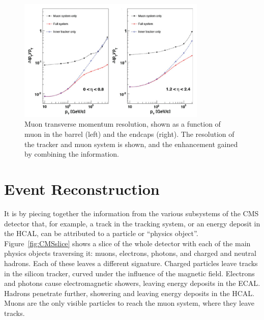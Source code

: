 \begin{figure}[htbp]
  \begin{center}
  \includegraphics[width=0.8\textwidth]{Figures/detector/CMSmuonRes}
  \caption{Muon transverse momentum resolution, shown as a function of muon \pt in the barrel (left) and the endcaps (right). The resolution of the tracker and muon system is shown, and the enhancement gained by combining the information.
}
  \label{fig:CMSmuonRes}
  \end{center}
\end{figure}

%                                                                  

\newpage
\section{Event Reconstruction} \label{sec:CMSreco}

It is by piecing together the information from the various subsystems of the \ac{CMS} detector that, for example, a track in the tracking system, or an energy deposit in the \ac{HCAL}, can be attributed to a particle or ``physics object''. 
Figure~\ref{fig:CMSslice} shows a slice of the whole detector with each of the main physics objects traversing it: muons, electrons, photons, and charged and neutral hadrons.
Each of these leaves a different signature.
Charged particles leave tracks in the silicon tracker, curved under the influence of the magnetic field.
Electrons and photons cause electromagnetic showers, leaving energy deposits in the \ac{ECAL}.
Hadrons penetrate further, showering and leaving energy deposits in the \ac{HCAL}. 
Muons are the only visible particles to reach the muon system, where they leave tracks.

